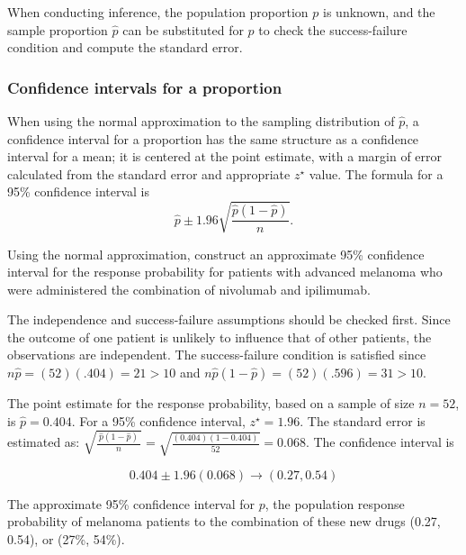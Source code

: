 When conducting inference, the population proportion $p$ is unknown, and the sample proportion $\hat{p}$ can be substituted for $p$ to check the success-failure condition and compute the standard error.

\subsubsection{Confidence intervals for a proportion}
\label{confIntForPropSection}


When using the normal approximation to the sampling distribution of $\hat{p}$, a confidence interval for a proportion has the same structure as a confidence interval for a mean; it is centered at the point estimate, with a margin of error calculated from the standard error and appropriate $z^{\star}$ value.  The formula for a 95\% confidence interval is
\[
  \hat{p} \pm 1.96 \sqrt{\frac{\hat{p}(1-\hat{p})}{n}}.
\]


\begin{example}{Using the normal approximation, construct an approximate 95\% confidence interval for the response probability for patients with advanced melanoma who were administered the combination of nivolumab and ipilimumab.}

The independence and success-failure assumptions should be checked first.  Since the outcome of one patient is unlikely to influence that of other patients, the observations are independent.  The success-failure condition is satisfied since $n\hat{p} = (52)(.404) = 21  > 10$ and $n\hat{p}(1 - \hat{p}) = (52)(.596) = 31  > 10$.

The point estimate for the response probability, based on a sample of size $n = 52$, is $\hat{p} = 0.404$. For a 95\% confidence interval, $z^{\star} = 1.96$. The standard error is estimated as: $\sqrt{\frac{\ \hat{p}(1-\hat{p})\ }{n}} = \sqrt{\frac{(0.404)(1-0.404)}{52}} = 0.068$.  The confidence interval is

\[0.404 \pm 1.96 (0.068) \rightarrow (0.27, 0.54) \]

The approximate 95\% confidence interval for $p$, the population response probability of melanoma patients to the combination of these new drugs (0.27, 0.54), or (27\%, 54\%).  

\end{example}

